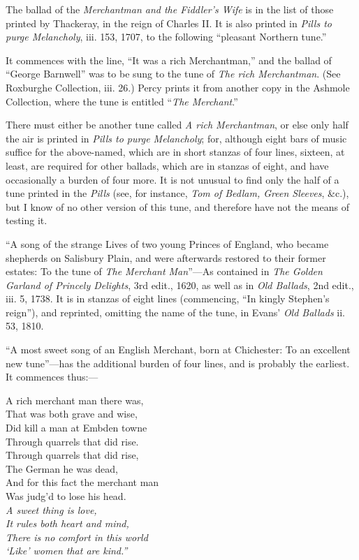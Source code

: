 \settowidth{\versewidth}{The Merchantman.}

The ballad of the \textit{Merchantman and the Fiddler’s Wife} is in the list of those
printed by Thackeray, in the reign of Charles II. It is also printed in \textit{Pills to
purge Melancholy}, iii. 153, 1707, to the following “pleasant Northern tune.”

It commences with the line, “It was a rich Merchantman,” and the ballad of
“George Barnwell” was to be sung to the tune of \textit{The rich Merchantman}. (See
Roxburghe Collection, iii. 26.) Percy prints it from another copy in the Ashmole
Collection, where the tune is entitled “\textit{The Merchant}.”

There must either be another tune called \textit{A rich Merchantman}, or else only
half the air is printed in \textit{ Pills to purge Melancholy}; for, although eight bars of
music suffice for the above-named, which are in short stanzas of four lines,
sixteen, at least, are required for other ballads, which are in stanzas of eight,
and have occasionally a burden of four more. It is not unusual to find only
the half of a tune printed in the \textit{Pills} (see, for instance, \textit{Tom of Bedlam, Green
Sleeves}, \&c.), but I know of no other version of this tune, and therefore have not
the means of testing it.

“A song of the strange Lives of two young Princes of England, who became
shepherds on Salisbury Plain, and were afterwards restored to their former
estates: To the tune of \textit{The Merchant Man}”—As contained in \textit{The Golden Garland
of Princely Delights}, 3rd edit., 1620, as well as in \textit{Old Ballads}, 2nd edit.,
iii. 5, 1738. It is in stanzas of eight lines (commencing, “In kingly Stephen’s
reign”), and reprinted, omitting the name of the tune, in Evans’ \textit{Old Ballads}
ii. 53, 1810.

“A most sweet song of an English Merchant, born at Chichester: To an
excellent new tune”—has the additional burden of four lines, and is probably
the earliest. It commences thus:—
\settowidth{\versewidth}{Did kill a man at Embden towne}
\begin{dcverse}\begin{patverse}
A rich merchant man there was,\\
That was both grave and wise,\\
Did kill a man at Embden towne\\
Through quarrels that did rise.\\
Through quarrels that did rise,\\
The German he was dead,\\
And for this fact the merchant man\\
Was judg’d to lose his head.\\
\textit{A sweet thing is love,\\
It rules both heart and mind,\\
There is no comfort in this world\\
‘Like’ women that are kind.”}
\end{patverse}
\end{dcverse}

